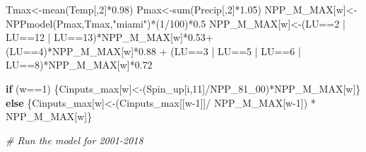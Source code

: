 \documentclass[
  10pt,
  b5paper,
]{book}
\newenvironment{Shaded}{\begin{snugshade}}{\end{snugshade}}
\newcommand{\CommentTok}[1]{\textcolor[rgb]{0.56,0.35,0.01}{\textit{#1}}}
\newcommand{\ControlFlowTok}[1]{\textcolor[rgb]{0.13,0.29,0.53}{\textbf{#1}}}
\newcommand{\DecValTok}[1]{\textcolor[rgb]{0.00,0.00,0.81}{#1}}
\newcommand{\FloatTok}[1]{\textcolor[rgb]{0.00,0.00,0.81}{#1}}
\newcommand{\FunctionTok}[1]{\textcolor[rgb]{0.00,0.00,0.00}{#1}}
\newcommand{\NormalTok}[1]{#1}
\newcommand{\OtherTok}[1]{\textcolor[rgb]{0.56,0.35,0.01}{#1}}
\newcommand{\SpecialCharTok}[1]{\textcolor[rgb]{0.00,0.00,0.00}{#1}}
\newcommand{\StringTok}[1]{\textcolor[rgb]{0.31,0.60,0.02}{#1}}
\begin{document}
\begin{Shaded}
\begin{Highlighting}[]
\NormalTok{Tmax}\OtherTok{\textless{}{-}}\FunctionTok{mean}\NormalTok{(Temp[,}\DecValTok{2}\NormalTok{]}\SpecialCharTok{*}\FloatTok{0.98}\NormalTok{)}
\NormalTok{Pmax}\OtherTok{\textless{}{-}}\FunctionTok{sum}\NormalTok{(Precip[,}\DecValTok{2}\NormalTok{]}\SpecialCharTok{*}\FloatTok{1.05}\NormalTok{)}
\NormalTok{NPP\_M\_MAX[w]}\OtherTok{\textless{}{-}}\FunctionTok{NPPmodel}\NormalTok{(Pmax,Tmax,}\StringTok{"miami"}\NormalTok{)}\SpecialCharTok{*}\NormalTok{(}\DecValTok{1}\SpecialCharTok{/}\DecValTok{100}\NormalTok{)}\SpecialCharTok{*}\FloatTok{0.5}
\NormalTok{NPP\_M\_MAX[w]}\OtherTok{\textless{}{-}}\NormalTok{(LU}\SpecialCharTok{==}\DecValTok{2} \SpecialCharTok{|}\NormalTok{ LU}\SpecialCharTok{==}\DecValTok{12} \SpecialCharTok{|}\NormalTok{ LU}\SpecialCharTok{==}\DecValTok{13}\NormalTok{)}\SpecialCharTok{*}\NormalTok{NPP\_M\_MAX[w]}\SpecialCharTok{*}\FloatTok{0.53}\SpecialCharTok{+}\NormalTok{ (LU}\SpecialCharTok{==}\DecValTok{4}\NormalTok{)}\SpecialCharTok{*}\NormalTok{NPP\_M\_MAX[w]}\SpecialCharTok{*}\FloatTok{0.88} \SpecialCharTok{+}\NormalTok{ (LU}\SpecialCharTok{==}\DecValTok{3} \SpecialCharTok{|}\NormalTok{ LU}\SpecialCharTok{==}\DecValTok{5} \SpecialCharTok{|}\NormalTok{ LU}\SpecialCharTok{==}\DecValTok{6} \SpecialCharTok{|}\NormalTok{ LU}\SpecialCharTok{==}\DecValTok{8}\NormalTok{)}\SpecialCharTok{*}\NormalTok{NPP\_M\_MAX[w]}\SpecialCharTok{*}\FloatTok{0.72}

\ControlFlowTok{if}\NormalTok{ (w}\SpecialCharTok{==}\DecValTok{1}\NormalTok{) \{Cinputs\_max[w]}\OtherTok{\textless{}{-}}\NormalTok{(Spin\_up[i,}\DecValTok{11}\NormalTok{]}\SpecialCharTok{/}\NormalTok{NPP\_81\_00)}\SpecialCharTok{*}\NormalTok{NPP\_M\_MAX[w]\} }\ControlFlowTok{else}\NormalTok{ \{Cinputs\_max[w]}\OtherTok{\textless{}{-}}\NormalTok{(Cinputs\_max[[w}\DecValTok{{-}1}\NormalTok{]]}\SpecialCharTok{/}\NormalTok{ NPP\_M\_MAX[w}\DecValTok{{-}1}\NormalTok{]) }\SpecialCharTok{*}\NormalTok{ NPP\_M\_MAX[w]\} }

\CommentTok{\# Run the model for 2001{-}2018 }


\end{Highlighting}
\end{Shaded}
\end{document}
